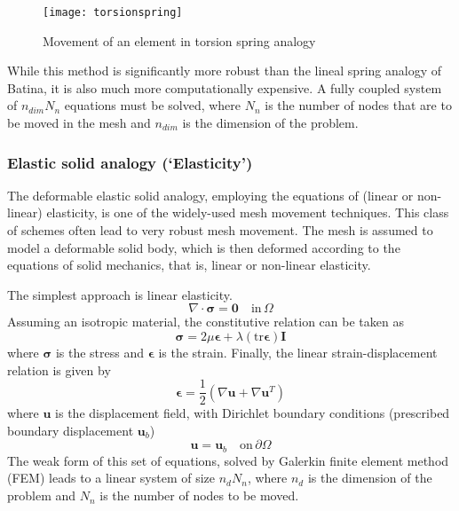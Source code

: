 \documentclass[11pt, ms, onehalfspacing]{ncsuthesis}
\let\bld\boldsymbol
\begin{document}
\begin{figure}
\centering
\texttt{[image: torsionspring]}
\caption{Movement of an element in torsion spring analogy}
\label{f:torsion}
\end{figure}

While this method is significantly more robust than the lineal spring analogy of Batina, it is also much more computationally expensive. A fully coupled system of $n_{dim} N_n$ equations must be solved, where $N_n$ is the number of nodes that are to be moved in the mesh and $n_{dim}$ is the dimension of the problem.

\subsubsection{Elastic solid analogy (`Elasticity')}

The deformable elastic solid analogy, employing the equations of (linear or non-linear) elasticity, is one of the widely-used mesh movement techniques. This class of schemes often lead to very robust mesh movement. The mesh is assumed to model a deformable solid body, which is then deformed according to the equations of solid mechanics, that is, linear or non-linear elasticity.

The simplest approach is linear elasticity.
\begin{equation}
\nabla \cdot \bld{\sigma}  = \mathbf{0} \quad \text{in} \, \Omega
\end{equation}
Assuming an isotropic material, the constitutive relation can be taken as
\begin{equation}
\bld{\sigma} = 2\mu\bld{\epsilon} + \lambda (\mathrm{tr}\boldsymbol{\epsilon}) \bld{I}
\label{linelast:constt}
\end{equation}
where $\bld{\sigma}$ is the stress and $\bld{\epsilon}$ is the strain.
Finally, the linear strain-displacement relation is given by
\begin{equation}
\bld{\epsilon} = \frac12 (\nabla\bld{u}+\nabla\bld{u}^T)
\label{linelast:strain}
\end{equation}
where $\bld{u}$ is the displacement field, with Dirichlet boundary conditions (prescribed boundary displacement $\bld{u}_b$)
\begin{equation}
\bld{u} = \bld{u}_b \quad \text{on} \, \partial\Omega
\end{equation}
The weak form of this set of equations, solved by Galerkin finite element method (FEM) leads to a linear system of size $n_d N_n$, where $n_d$ is the dimension of the problem and $N_n$ is the number of nodes to be moved.
\end{document}
